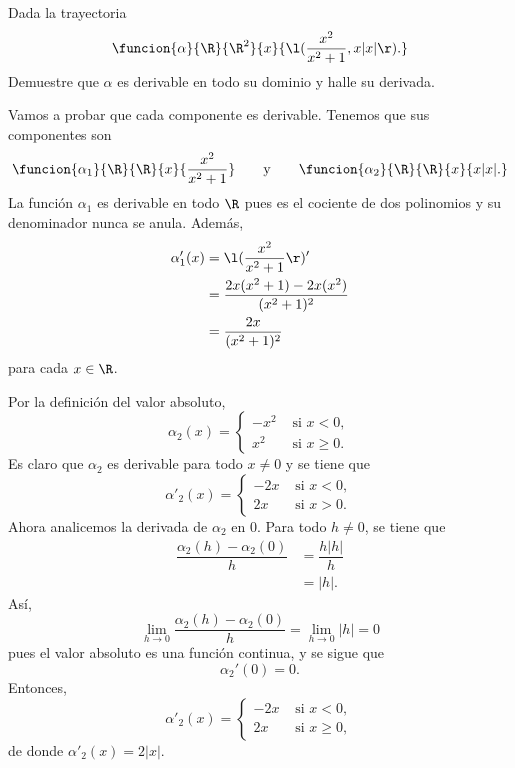 \documentclass[a4,11pt]{aleph-examen}
\begin{document}
\begin{preguntas}
\item 
    Dada la trayectoria 
    \[
        \funcion{\alpha}{\R}{\R^2}{x}{\l(\dfrac{x^2}{x^2+1},x|x|\r).}
    \]
    Demuestre que $\alpha$ es derivable en todo su dominio y halle su derivada.

\begin{respuesta}
    Vamos a probar que cada componente es derivable. Tenemos que sus componentes son
    \[
        \funcion{\alpha_1}{\R}{\R}{x}{\dfrac{x^2}{x^2+1}}
        \qquad \text y \qquad
        \funcion{\alpha_2}{\R}{\R}{x}{x|x|.}
    \]
    La función $\alpha_1$ es derivable en todo $\R$ pues es el cociente de dos polinomios y su denominador nunca se anula. Además,
        \begin{align*}
            \alpha_1'(x)
                &=\l(\dfrac{x^2}{x^2+1}\r)'\\
                &=\dfrac{2x(x^2+1)-2x(x^2)}{(x^2+1)^2}\\
                &=\dfrac{2x}{(x^2+1)^2}
        \end{align*}
        para cada $x\in\R$. 
        
    Por la definición del valor absoluto,
        \[
            \alpha_2(x)=
                \begin{cases}
                    -x^2&\text{ si }x<0,\\
                    x^2&\text{ si }x\geq0.
                \end{cases}
        \]
        Es claro que $\alpha_2$ es derivable para todo $x\neq 0$ y se tiene que
        \[
            \alpha'_2(x)=
                \begin{cases}
                    -2x&\text{ si }x<0,\\
                    2x&\text{ si }x>0.
                \end{cases}
        \]
        Ahora analicemos la derivada de $\alpha_2$ en 0. Para todo $h\neq0$, se tiene que
        \begin{align*}
            \dfrac{\alpha_2(h)-\alpha_2(0)}{h}
                &=\dfrac{h|h|}{h}\\
                &=|h|.
        \end{align*}
        Así,
        \[
            \lim_{h\to 0}\dfrac{\alpha_2(h)-\alpha_2(0)}{h}
            =\lim_{h\to 0}|h|=0
        \]
        pues el valor absoluto es una función continua, y se sigue que 
        \[
            \alpha_2'(0)=0.
        \]
        Entonces,
        \[
            \alpha'_2(x)=
            \begin{cases}
                -2x&\text{ si }x<0,\\
                2x&\text{ si }x\geq 0,
            \end{cases}
        \]
        de donde $\alpha'_2(x)=2|x|$.
    

\end{respuesta}
\end{preguntas}
\end{document}
